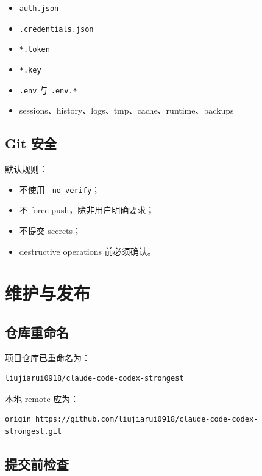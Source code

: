 \documentclass[11pt,a4paper]{ctexbook}
\begin{document}
\begin{itemize}[leftmargin=2em]
  \item \texttt{auth.json}
  \item \texttt{.credentials.json}
  \item \texttt{*.token}
  \item \texttt{*.key}
  \item \texttt{.env} 与 \texttt{.env.*}
  \item sessions、history、logs、tmp、cache、runtime、backups
\end{itemize}

\section{Git 安全}

默认规则：

\begin{itemize}[leftmargin=2em]
  \item 不使用 \texttt{--no-verify}；
  \item 不 force push，除非用户明确要求；
  \item 不提交 secrets；
  \item destructive operations 前必须确认。
\end{itemize}

\chapter{维护与发布}

\section{仓库重命名}

项目仓库已重命名为：

\begin{lstlisting}[language={}]
liujiarui0918/claude-code-codex-strongest
\end{lstlisting}

本地 remote 应为：

\begin{lstlisting}[language={}]
origin https://github.com/liujiarui0918/claude-code-codex-strongest.git
\end{lstlisting}

\section{提交前检查}
\end{document}
